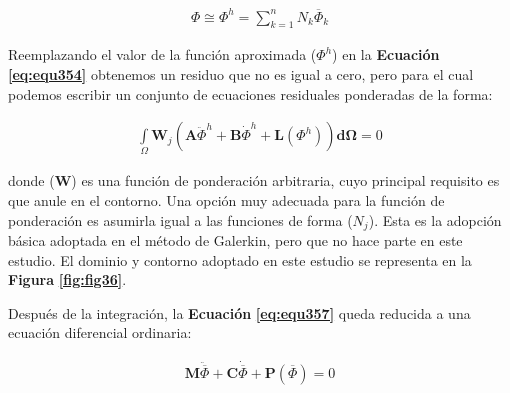 \begin{ceqn} %
\begin{gather}\label{eq:equ356}
\Phi \cong \Phi^h = \displaystyle\sum_{k=1}^{n} N_k\overline{\Phi}_k
\end{gather}   
\end{ceqn}


Reemplazando el valor de la función aproximada ($\Phi^h$) en la \textbf{Ecuación} \textbf{\ref{eq:equ354}} obtenemos un residuo que no es igual a cero, pero para el cual
podemos escribir un conjunto de ecuaciones residuales ponderadas de la forma:

\begin{ceqn} %
\begin{gather}\label{eq:equ357}
\int\limits_\Omega \mathbf{W}_j\left(\mathbf{A}\ddot{\Phi}^h + \mathbf{B}\dot{\Phi}^h + \mathbf{L}(\Phi^h)\right)\mathbf{d\Omega} = 0
\end{gather}   
\end{ceqn}

donde ($\mathbf{W}$) es una función de ponderación arbitraria, cuyo principal requisito es que anule en el contorno. Una opción muy adecuada para la función de ponderación es asumirla igual a las funciones de forma ($N_j$). Esta es la adopción básica adoptada en el método de Galerkin, pero que no hace parte en este estudio. El dominio y contorno adoptado en este estudio se representa en la \textbf{Figura} \textbf{\ref{fig:fig36}}.\bigskip


Después de la integración, la \textbf{Ecuación} \textbf{\ref{eq:equ357}} queda reducida a una ecuación diferencial ordinaria:

\begin{ceqn} %
\begin{gather}\label{eq:equ358}
\mathbf{M}\ddot{\overline{\Phi}} + \mathbf{C}\dot{\overline{\Phi}} + \mathbf{P}(\overline{\Phi}) = 0
\end{gather}   
\end{ceqn}

